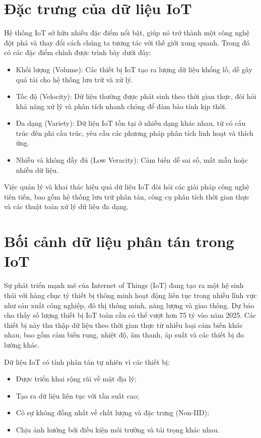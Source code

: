 \section{Đặc trưng của dữ liệu IoT}

\hspace{0.6cm}Hệ thống IoT sở hữu nhiều đặc điểm nổi bật, giúp nó trở thành một công nghệ đột phá và thay đổi cách chúng ta tương tác với thế giới xung quanh. Trong đó có các đặc điểm chính được trình bày dưới đây:
\begin{itemize}
  \item Khối lượng (Volume): Các thiết bị IoT tạo ra lượng dữ liệu khổng lồ, dễ gây quá tải cho hệ thống lưu trữ và xử lý.
  
  \item Tốc độ (Velocity): Dữ liệu thường được phát sinh theo thời gian thực, đòi hỏi khả năng xử lý và phân tích nhanh chóng để đảm bảo tính kịp thời.
  
  \item Đa dạng (Variety): Dữ liệu IoT tồn tại ở nhiều dạng khác nhau, từ có cấu trúc đến phi cấu trúc, yêu cầu các phương pháp phân tích linh hoạt và thích ứng.
  
  \item Nhiễu và không đầy đủ (Low Veracity): Cảm biến dễ sai số, mất mẫu hoặc nhiễu dữ liệu.
\end{itemize}    
Việc quản lý và khai thác hiệu quả dữ liệu IoT đòi hỏi các giải pháp công nghệ tiên tiến, bao gồm hệ thống lưu trữ phân tán, công cụ phân tích thời gian thực và các thuật toán xử lý dữ liệu đa dạng.
\section{Bối cảnh dữ liệu phân tán trong IoT}

\hspace{0.6cm}Sự phát triển mạnh mẽ của Internet of Things (IoT) đang tạo ra một hệ sinh thái với hàng chục tỷ thiết bị thông minh hoạt động liên tục trong nhiều lĩnh vực như sản xuất công nghiệp, đô thị thông minh, năng lượng và giao thông. Dự báo cho thấy số lượng thiết bị IoT toàn cầu có thể vượt hơn 75 tỷ vào năm 2025. Các thiết bị này thu thập dữ liệu theo thời gian thực từ nhiều loại cảm biến khác nhau, bao gồm cảm biến rung, nhiệt độ, âm thanh, áp suất và các thiết bị đo lường khác.

Dữ liệu IoT có tính phân tán tự nhiên vì các thiết bị:

\begin{itemize}
    \item Được triển khai rộng rãi về mặt địa lý;
    \item Tạo ra dữ liệu liên tục với tần suất cao;
    \item Có sự không đồng nhất về chất lượng và đặc trưng (Non-IID);
    \item Chịu ảnh hưởng bởi điều kiện môi trường và tải trọng khác nhau.
\end{itemize}

